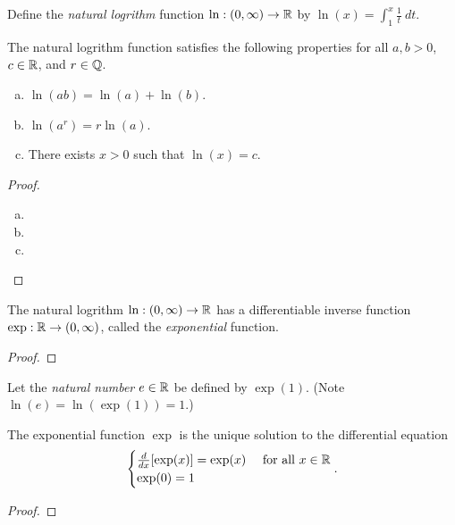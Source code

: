 \documentclass[letterpaper, twoside, 12pt]{book}
\begin{document}
\begin{definition}
  Define the \textit{natural logrithm} function
  \(\ln:(0,\infty)\to\mathbb R\) by \(\ln(x)=\int_1^x\frac{1}{t}~dt\).
\end{definition}

\begin{theorem}[5.1]
  The natural logrithm function satisfies the following properties for
  all \(a,b>0\), \(c\in\mathbb R\), and \(r\in\mathbb Q\).
  \begin{enumerate}[(a)]
    \item \(\ln(ab)=\ln(a)+\ln(b)\).
    \item \(\ln(a^r)=r\ln(a)\).
    \item There exists \(x>0\) such that \(\ln(x)=c\).
  \end{enumerate}
\end{theorem}
\begin{proof}
  \begin{enumerate}[(a)]
    \item

    \item

    \item

  \end{enumerate}
\end{proof}

\begin{proposition}[pg. 120]
  The natural logrithm
  \(\ln:(0,\infty)\to\mathbb R\)
  has a differentiable inverse function \(\exp:\mathbb R\to(0,\infty)\),
  called the \textit{exponential} function.
\end{proposition}
\begin{proof}

\end{proof}

\begin{definition}
  Let the \textit{natural number}
  \(e\in\mathbb R\) be defined by \(\exp(1)\). (Note
  \(\ln(e)=\ln(\exp(1))=1\).)
\end{definition}

\begin{proposition}[pg. 120]
  The exponential function \(\exp\) is the unique solution to the
  differential equation
  \[
    \begin{cases}
      \frac{d}{dx}[\exp(x)]=\exp(x) & \text{ for all } x\in \mathbb R \\
      \exp(0)=1
    \end{cases}
  .\]
\end{proposition}
\begin{proof}

\end{proof}
\end{document}
